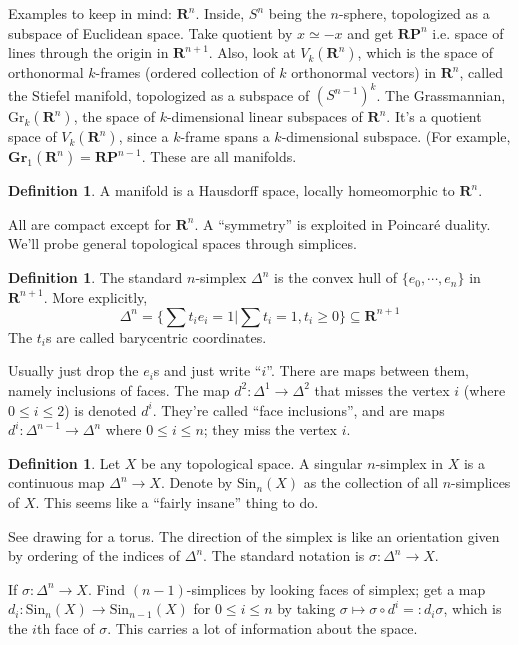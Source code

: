 \documentclass{amsart}
\theoremstyle{theorem}
\theoremstyle{definition}
\newtheorem{definition}[theorem]{Definition}
\newcommand{\Sin}{\mathrm{Sin}}
\begin{document}
Examples to keep in mind: $\mathbf{R}^n$. Inside, $S^n$ being the $n$-sphere, topologized as a subspace of Euclidean space. Take quotient by $x\simeq -x$ and get $\mathbf{RP}^n$ i.e. space of lines through the origin in $\mathbf{R}^{n+1}$. Also, look at $V_k(\mathbf{R}^n)$, which is the space of orthonormal $k$-frames (ordered collection of $k$ orthonormal vectors) in $\mathbf{R}^n$, called the Stiefel manifold, topologized as a subspace of $(S^{n-1})^k$. The Grassmannian, $\mathrm{Gr}_k(\mathbf{R}^n)$, the space of $k$-dimensional linear subspaces of $\mathbf{R}^n$. It's a quotient space of $V_k(\mathbf{R}^n)$, since a $k$-frame spans a $k$-dimensional subspace. (For example, $\mathbf{Gr}_1(\mathbf{R}^n) = \mathbf{RP}^{n-1}$. These are all manifolds.
\begin{definition}
A manifold is a Hausdorff space, locally homeomorphic to $\mathbf{R}^n$.
\end{definition}
All are compact except for $\mathbf{R}^n$. A ``symmetry'' is exploited in Poincar\'{e} duality. We'll probe general topological spaces through simplices.
\begin{definition}
The standard $n$-simplex $\Delta^n$ is the convex hull of $\{e_0,\cdots,e_n\}$ in $\mathbf{R}^{n+1}$. More explicitly,
$$\Delta^n = \{\sum t_i e_i = 1 | \sum t_i = 1, t_i\geq 0\}\subseteq\mathbf{R}^{n+1}$$
The $t_i$s are called barycentric coordinates.
\end{definition}
Usually just drop the $e_i$s and just write ``$i$''. There are maps between them, namely inclusions of faces. The map $d^2:\Delta^1\to\Delta^2$ that misses the vertex $i$ (where $0\leq i\leq 2$) is denoted $d^i$. They're called ``face inclusions'', and are maps $d^i:\Delta^{n-1}\to\Delta^n$ where $0\leq i\leq n$; they miss the vertex $i$.
\begin{definition}
Let $X$ be any topological space. A singular $n$-simplex in $X$ is a continuous map $\Delta^n\to X$. Denote by $\mathrm{Sin}_n(X)$ as the collection of all $n$-simplices of $X$. This seems like a ``fairly insane'' thing to do.
\end{definition}
See drawing for a torus. The direction of the simplex is like an orientation given by ordering of the indices of $\Delta^n$. The standard notation is $\sigma:\Delta^n\to X$.

If $\sigma:\Delta^n\to X$. Find $(n-1)$-simplices by looking faces of simplex; get a map $d_i:\Sin_n(X)\to\Sin_{n-1}(X)$ for $0\leq i\leq n$ by taking $\sigma\mapsto\sigma\circ d^i=: d_i\sigma$, which is the $i$th face of $\sigma$. This carries a lot of information about the space.
\end{document}
